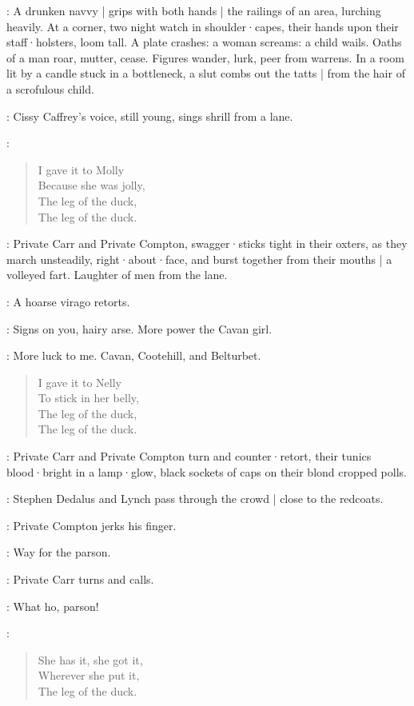 :
A drunken navvy |
grips with both hands |
the railings of an area,
lurching heavily.
At a corner,
two night watch in shoulder·capes,
their hands upon their staff·holsters,
loom tall.
A plate crashes:
a woman screams:
a child wails.
Oaths of a man roar,
mutter,
cease.
Figures wander,
lurk,
peer from warrens.
In a room lit by a candle stuck in a bottleneck,
a slut combs out the tatts |
from the hair of a scrofulous child.

:
Cissy Caffrey's voice,
still young,
sings shrill from a lane.

\Cissy:
\begin{verse}
    I gave it to Molly\\
    Because she was jolly,\\
    The leg of the duck,\\
    The leg of the duck.
\end{verse}

:
Private Carr and Private Compton,
swagger·sticks tight in their oxters,
as they march unsteadily,
right·about·face,
and burst together from their mouths |
a volleyed fart.
Laughter of men from the lane.

:
A hoarse virago retorts.

\Virago:
Signs on you,
hairy arse.
More power the Cavan girl.

\Cissy:
More luck to me.
Cavan,
Cootehill,
and Belturbet.

\begin{verse}
    I gave it to Nelly\\
    To stick in her belly,\\
    The leg of the duck,\\
    The leg of the duck.
\end{verse}

:
Private Carr and Private Compton turn and counter·retort,
their tunics blood·bright in a lamp·glow,
black sockets of caps on their blond cropped polls.

:
Stephen Dedalus and Lynch pass through the crowd |
close to the redcoats.

:
Private Compton jerks his finger.

\Compton:
Way for the parson.

:
Private Carr turns and calls.

\Carr:
What ho,
parson!

\Cissy:

\begin{verse}
%
    She has it, she got it,\\
    Wherever she put it,\\
    The leg of the duck.
\end{verse}

